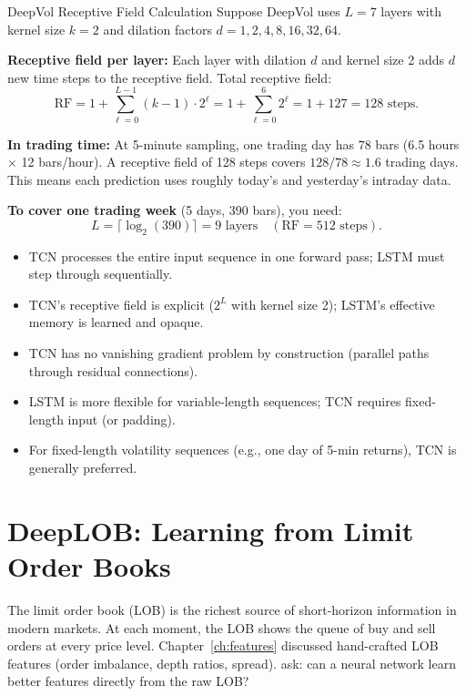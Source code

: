 \begin{workedexample}{DeepVol Receptive Field Calculation}
Suppose DeepVol uses $L = 7$ layers with kernel size $k = 2$ and dilation factors $d = 1, 2, 4, 8, 16, 32, 64$.

\textbf{Receptive field per layer:}
Each layer with dilation $d$ and kernel size 2 adds $d$ new time steps to the receptive field.
Total receptive field:
\[
  \text{RF} = 1 + \sum_{\ell=0}^{L-1} (k-1) \cdot 2^\ell
  = 1 + \sum_{\ell=0}^{6} 2^\ell
  = 1 + 127 = 128 \text{ steps.}
\]

\textbf{In trading time:}
At 5-minute sampling, one trading day has $78$ bars (6.5 hours $\times$ 12 bars/hour).
A receptive field of 128 steps covers $128 / 78 \approx 1.6$ trading days.
This means each prediction uses roughly today's and yesterday's intraday data.

\textbf{To cover one trading week} (5 days, 390 bars), you need:
\[
  L = \lceil \log_2(390) \rceil = 9 \text{ layers} \quad (\text{RF} = 512 \text{ steps}).
\]
\end{workedexample}

\begin{keyidea}
\begin{itemize}[nosep]
  \item TCN processes the entire input sequence in one forward pass; LSTM must step through sequentially.
  \item TCN's receptive field is explicit ($2^L$ with kernel size 2); LSTM's effective memory is learned and opaque.
  \item TCN has no vanishing gradient problem by construction (parallel paths through residual connections).
  \item LSTM is more flexible for variable-length sequences; TCN requires fixed-length input (or padding).
  \item For fixed-length volatility sequences (e.g., one day of 5-min returns), TCN is generally preferred.
\end{itemize}
\end{keyidea}


\section{DeepLOB: Learning from Limit Order Books}\label{sec:dl:deeplob}

The limit order book (LOB) is the richest source of short-horizon information in modern markets.
At each moment, the LOB shows the queue of buy and sell orders at every price level.
Chapter~\ref{ch:features} discussed hand-crafted LOB features (order imbalance, depth ratios, spread).
\citet{ZhangZohrenRoberts2019DeepLOB} ask: can a neural network learn better features directly from the raw LOB?

